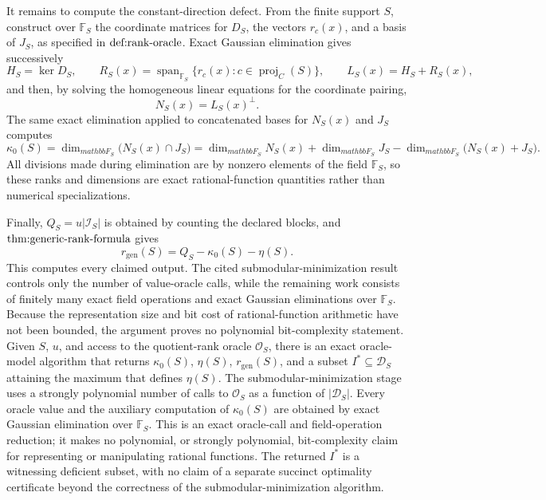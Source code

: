 It remains to compute the constant-direction defect.  From the finite support \(S\), construct over \(\mathbb F_S\) the coordinate matrices for \(D_S\), the vectors \(r_c(x)\), and a basis of \(J_S\), as specified in \(\textnormal{def:rank-oracle}\).  Exact Gaussian elimination gives successively
\[
 H_S=\ker D_S,
 \qquad
 R_S(x)=\operatorname{span}_{\mathbb F_S}\{r_c(x):c\in\operatorname{proj}_C(S)\},
 \qquad
 L_S(x)=H_S+R_S(x),
\]
and then, by solving the homogeneous linear equations for the coordinate pairing,
\[
 N_S(x)=L_S(x)^\perp.
\]
The same exact elimination applied to concatenated bases for \(N_S(x)\) and \(J_S\) computes
\[
 \kappa_0(S)
 =\dim_{mathbb F_S}\bigl(N_S(x)\cap J_S\bigr)
 =\dim_{mathbb F_S}N_S(x)+\dim_{mathbb F_S}J_S
  -\dim_{mathbb F_S}\bigl(N_S(x)+J_S\bigr).
\]
All divisions made during elimination are by nonzero elements of the field \(\mathbb F_S\), so these ranks and dimensions are exact rational-function quantities rather than numerical specializations.

Finally, \(Q_S=u|\mathcal I_S|\) is obtained by counting the declared blocks, and \(\textnormal{thm:generic-rank-formula}\) gives
\[
 r_{\mathrm{gen}}(S)=Q_S-\kappa_0(S)-\eta(S).
\]
This computes every claimed output.  The cited submodular-minimization result controls only the number of value-oracle calls, while the remaining work consists of finitely many exact field operations and exact Gaussian eliminations over \(\mathbb F_S\).  Because the representation size and bit cost of rational-function arithmetic have not been bounded, the argument proves no polynomial bit-complexity statement.
Given \(S\), \(u\), and access to the quotient-rank oracle \(\mathcal O_S\), there is an exact oracle-model algorithm that returns \(\kappa_0(S)\), \(\eta(S)\), \(r_{\mathrm{gen}}(S)\), and a subset \(I^*\subseteq\mathcal D_S\) attaining the maximum that defines \(\eta(S)\).  The submodular-minimization stage uses a strongly polynomial number of calls to \(\mathcal O_S\) as a function of \(|\mathcal D_S|\).  Every oracle value and the auxiliary computation of \(\kappa_0(S)\) are obtained by exact Gaussian elimination over \(\mathbb F_S\).  This is an exact oracle-call and field-operation reduction; it makes no polynomial, or strongly polynomial, bit-complexity claim for representing or manipulating rational functions.  The returned \(I^*\) is a witnessing deficient subset, with no claim of a separate succinct optimality certificate beyond the correctness of the submodular-minimization algorithm.
